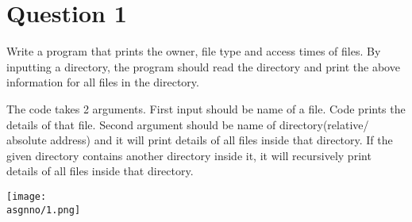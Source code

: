 \documentclass[main.tex]{subfiles}
\begin{document}
\section{Question 1}

Write a program that prints the owner, file type and access times of files. By
inputting a directory, the program should read the directory and print the above
information for all files in the directory.



The code takes 2 arguments. First input should be name of a file. Code prints
the details of that file. Second argument should be name of directory(relative/
absolute address) and it will print details of all files inside that directory.
If the given directory contains another directory inside it, it will recursively
print details of all files inside that directory.

\centering\texttt{[image: \\asgnno/1.png]}
\clearpage
\end{document}
